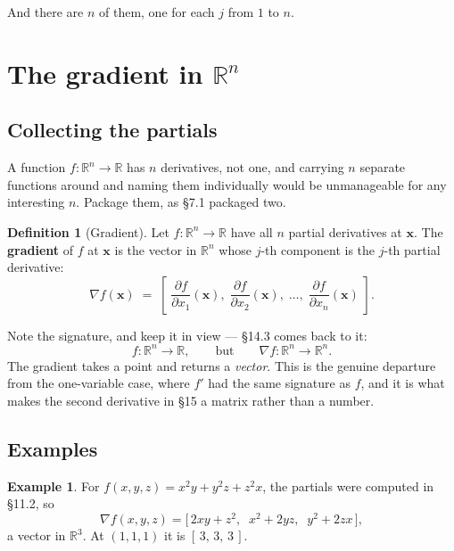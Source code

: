 \documentclass[11pt]{article}
\theoremstyle{plain}
\theoremstyle{definition}
\newtheorem{defn}{Definition}[section]
\newtheorem{ex}{Example}[section]
\theoremstyle{remark}
\newcommand{\R}{\mathbb{R}}
\newcommand{\vc}[1]{\mathbf{#1}}
\newcommand{\grad}{\nabla}
\newcommand{\pd}[2]{\frac{\partial #1}{\partial #2}}
\begin{document}
And there are $n$ of them, one for each $j$ from $1$ to $n$.

\section{The gradient in \texorpdfstring{$\R^{n}$}{Rn}}

\subsection{Collecting the partials}
A function $f:\R^{n}\to\R$ has $n$ derivatives, not one, and carrying $n$
separate functions around and naming them individually would be unmanageable for
any interesting $n$. Package them, as \S7.1 packaged two.

\begin{defn}[Gradient]
Let $f:\R^{n}\to\R$ have all $n$ partial derivatives at $\vc{x}$. The
\textbf{gradient} of $f$ at $\vc{x}$ is the vector in $\R^{n}$ whose $j$-th
component is the $j$-th partial derivative:
\[
  \grad f(\vc{x})
  \;=\;
  \left[\;
    \pd{f}{x_1}(\vc{x}),\;
    \pd{f}{x_2}(\vc{x}),\;
    \dots,\;
    \pd{f}{x_n}(\vc{x})
  \;\right] .
\]
\end{defn}

\noindent Note the signature, and keep it in view --- \S14.3 comes back to it:
\begin{equation}\label{eq:gradsig}
  f:\R^{n}\to\R,
  \qquad\text{but}\qquad
  \grad f:\R^{n}\to\R^{n} .
\end{equation}
The gradient takes a point and returns a \emph{vector}. This is the genuine
departure from the one-variable case, where $f'$ had the same signature as $f$,
and it is what makes the second derivative in \S15 a matrix rather than a
number.

\subsection{Examples}
\begin{ex}
For $f(x,y,z)=x^{2}y+y^{2}z+z^{2}x$, the partials were computed in \S11.2, so
\[
  \grad f(x,y,z)=\bigl[\,2xy+z^{2},\;\;x^{2}+2yz,\;\;y^{2}+2zx\,\bigr] ,
\]
a vector in $\R^{3}$. At $(1,1,1)$ it is $[\,3,\,3,\,3\,]$.
\end{ex}
\end{document}
